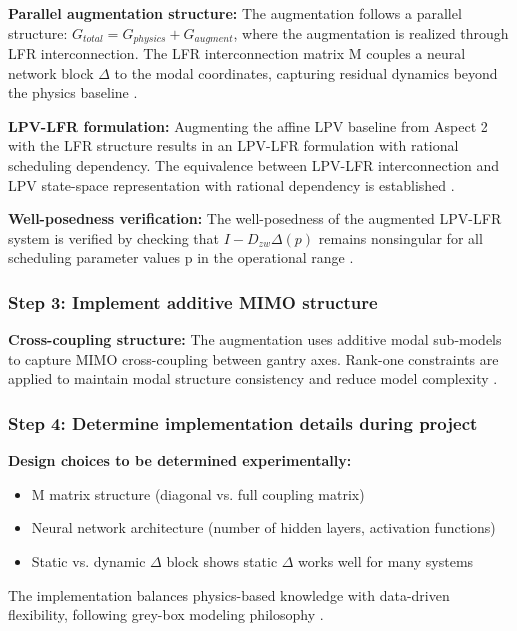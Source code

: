 \textbf{Parallel augmentation structure:}
The augmentation follows a parallel structure: $G_{total} = G_{physics} + G_{augment}$, where the augmentation is realized through LFR interconnection. The LFR interconnection matrix M couples a neural network block $\Delta$ to the modal coordinates, capturing residual dynamics beyond the physics baseline \citep{hoekstra2025learning}. 

\textbf{LPV-LFR formulation:}
Augmenting the affine LPV baseline from Aspect 2 with the LFR structure results in an LPV-LFR formulation with rational scheduling dependency. The equivalence between LPV-LFR interconnection and LPV state-space representation with rational dependency is established \citep{drenth2025efficient}.

\textbf{Well-posedness verification:}
The well-posedness of the augmented LPV-LFR system is verified by checking that $I - D_{zw}\Delta(p)$ remains nonsingular for all scheduling parameter values p in the operational range \citep{drenth2025efficient}.

\subsubsection{Step 3: Implement additive MIMO structure}

\textbf{Cross-coupling structure:}
The augmentation uses additive modal sub-models to capture MIMO cross-coupling between gantry axes. Rank-one constraints are applied to maintain modal structure consistency and reduce model complexity \citep{vanderhulst2025additive, vanderhulst2025rankone, gonzalez2025rankone}.

\subsubsection{Step 4: Determine implementation details during project}

\textbf{Design choices to be determined experimentally:}
\begin{itemize}
    \item M matrix structure (diagonal vs. full coupling matrix)
    \item Neural network architecture (number of hidden layers, activation functions)
    \item Static vs. dynamic $\Delta$ block \citep{hoekstra2025learning} shows static $\Delta$ works well for many systems
\end{itemize}

The implementation balances physics-based knowledge with data-driven flexibility, following grey-box modeling philosophy \citep{schoukens2019nonlinear}.

